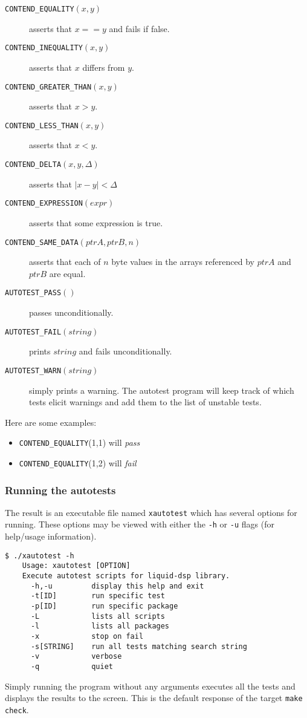 \begin{description}
\item[{\tt CONTEND\_EQUALITY}$(x,y)$] asserts that $x==y$ and fails if
false.
\item[{\tt CONTEND\_INEQUALITY}$(x,y)$] asserts that $x$ differs from
$y$.
\item[{\tt CONTEND\_GREATER\_THAN}$(x,y)$] asserts that $x>y$.
\item[{\tt CONTEND\_LESS\_THAN}$(x,y)$] asserts that $x<y$.
\item[{\tt CONTEND\_DELTA}$(x,y,\Delta)$] asserts that $|x-y|<\Delta$
\item[{\tt CONTEND\_EXPRESSION}$(expr)$] asserts that some expression is
true.
\item[{\tt CONTEND\_SAME\_DATA}$(ptrA,ptrB,n)$] asserts that each of $n$
byte values in the arrays referenced by $ptrA$ and $ptrB$ are equal.
\item[{\tt AUTOTEST\_PASS}$()$] passes unconditionally.
\item[{\tt AUTOTEST\_FAIL}$(string)$] prints $string$ and fails
unconditionally.
\item[{\tt AUTOTEST\_WARN}$(string)$] simply prints a warning.
The autotest program will keep track of which tests elicit warnings and add
them to the list of unstable tests.
\end{description}

Here are some examples:
\begin{itemize}
\item[] {\tt CONTEND\_EQUALITY}(1,1) will {\it pass}
\item[] {\tt CONTEND\_EQUALITY}(1,2) will {\it fail}
\end{itemize}

\subsubsection{Running the autotests}
The result is an executable file named {\tt xautotest} which has several
options for running.
These options may be viewed with either the {\tt -h} or {\tt -u} flags (for
help/usage information).
%
\begin{Verbatim}[fontsize=\small]
    $ ./xautotest -h
    Usage: xautotest [OPTION]
    Execute autotest scripts for liquid-dsp library.
      -h,-u         display this help and exit
      -t[ID]        run specific test
      -p[ID]        run specific package
      -L            lists all scripts
      -l            lists all packages
      -x            stop on fail
      -s[STRING]    run all tests matching search string
      -v            verbose
      -q            quiet
\end{Verbatim}
%
Simply running the program without any arguments executes all the tests and
displays the results to the screen.
This is the default response of the target {\tt make check}.

